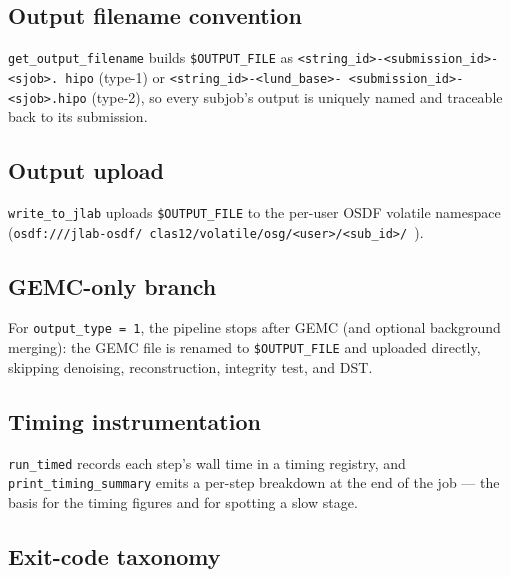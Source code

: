 \subsection{Output filename convention}

\texttt{get\_\allowbreak{}output\_\allowbreak{}filename} builds \texttt{\$OUTPUT\_\allowbreak{}FILE} as
\texttt{<string\_\allowbreak{}id>-\allowbreak{}<submission\_\allowbreak{}id>-\allowbreak{}<sjob>.\allowbreak{}%
hipo} (type-1) or
\texttt{<string\_\allowbreak{}id>-\allowbreak{}<lund\_\allowbreak{}base>-\allowbreak{}%
<submission\_\allowbreak{}id>-\allowbreak{}<sjob>.\allowbreak{}hipo} (type-2), so every subjob's output is
uniquely named and traceable back to its submission.

\subsection{Output upload}

\texttt{write\_\allowbreak{}to\_\allowbreak{}jlab} uploads \texttt{\$OUTPUT\_\allowbreak{}FILE} to the per-user
OSDF volatile namespace
(\texttt{osdf:\allowbreak{}/\allowbreak{}/\allowbreak{}/\allowbreak{}jlab-\allowbreak{}osdf/\allowbreak{}%
clas12/\allowbreak{}volatile/\allowbreak{}osg/\allowbreak{}<user>/\allowbreak{}<sub\_\allowbreak{}id>/%
\allowbreak{}}).

\subsection{GEMC-only branch}

For \texttt{output\_\allowbreak{}type =\allowbreak{} 1}, the pipeline stops after GEMC (and optional background
merging): the GEMC file is renamed to \texttt{\$OUTPUT\_\allowbreak{}FILE} and uploaded directly, skipping
denoising, reconstruction, integrity test, and DST.

\subsection{Timing instrumentation}

\texttt{run\_\allowbreak{}timed} records each step's wall time in a timing registry, and
\texttt{print\_\allowbreak{}timing\_\allowbreak{}summary} emits a per-step breakdown at the end of the job ---
the basis for the timing figures and for spotting a slow stage.

\subsection{Exit-code taxonomy}

